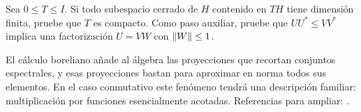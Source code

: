 \begin{ejercicio}\label{ej:v3-l34-5}
Sea $0\le T\le I$. Si todo subespacio cerrado de $H$ contenido en $TH$ tiene dimensión finita, pruebe que $T$ es compacto. Como paso auxiliar, pruebe que $UU^*\le VV^*$ implica una factorización $U=VW$ con $\left\lVert W\right\rVert\le1$.
\end{ejercicio}


El cálculo boreliano añade al álgebra las proyecciones que recortan conjuntos espectrales, y esas proyecciones bastan para aproximar en norma todos sus elementos. En el caso conmutativo este fenómeno tendrá una descripción familiar: multiplicación por funciones esencialmente acotadas. Referencias para ampliar: \cite{conway1990,murphy1990,zhu1993}.
